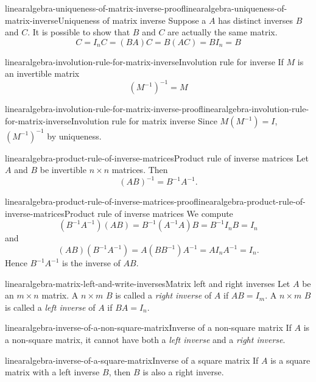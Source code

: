 \documentclass[preview]{standalone}
\begin{document}
\begin{snippetproof}{linearalgebra-uniqueness-of-matrix-inverse-proof}{linearalgebra-uniqueness-of-matrix-inverse}{Uniqueness of matrix inverse}
    Suppose a \matrix \(A\) has distinct inverses \(B\)
    and \(C\).
    It is possible to show that \(B\) and \(C\) are actually
    the same matrix.
    \[
        C=I_n C = (BA) C = B (AC) = BI_n = B
    \]
\end{snippetproof}

\begin{snippetproposition}{linearalgebra-involution-rule-for-matrix-inverse}{Involution rule for \matrix inverse}
    If \(M\) is an invertible matrix
    \[
        {(M^{-1})}^{-1} = M
    \]
\end{snippetproposition}

\begin{snippetproof}{linearalgebra-involution-rule-for-matrix-inverse-proof}{linearalgebra-involution-rule-for-matrix-inverse}{Involution rule for matrix inverse}
    Since \(M(M^{-1}) = I\), \({(M^{-1})}^{-1}\)
    by uniqueness. %
\end{snippetproof}

\begin{snippetproposition}{linearalgebra-product-rule-of-inverse-matrices}{Product rule of inverse matrices}
    Let \(A\) and \(B\) be invertible \(n\times n\) matrices. Then
    \[
        {(AB)}^{-1} = B^{-1} A^{-1}.
    \]
\end{snippetproposition}

\begin{snippetproof}{linearalgebra-product-rule-of-inverse-matrices-proof}{linearalgebra-product-rule-of-inverse-matrices}{Product rule of inverse matrices}
    We compute
    \[
        (B^{-1}A^{-1})(AB)
        =
        B^{-1}(A^{-1}A)B
        =
        B^{-1}I_nB
        =
        I_n
    \]
    and
    \[
        (AB)(B^{-1}A^{-1})
        =
        A(BB^{-1})A^{-1}
        =
        AI_nA^{-1}
        =
        I_n.
    \]
    Hence \(B^{-1}A^{-1}\) is the inverse of \(AB\).
\end{snippetproof}

\begin{snippetdefinition}{linearalgebra-matrix-left-and-write-inverses}{Matrix left and right inverses}
    Let \(A\) be an \(m \times n\) matrix. A \(n\times m\) \matrix \(B\)
    is called a \textit{right inverse} of \(A\)
    if \(AB=I_m\).
    A \(n\times m\) \matrix \(B\) is called a \textit{left inverse} of \(A\)
    if \(BA=I_n\).
\end{snippetdefinition}

\begin{snippetproposition}{linearalgebra-inverse-of-a-non-square-matrix}{Inverse of a non-square matrix}
    If \(A\) is a non-square matrix, it cannot have
    both a \textit{left inverse} and a \textit{right inverse}.
\end{snippetproposition}

\begin{snippetproposition}{linearalgebra-inverse-of-a-square-matrix}{Inverse of a square matrix}
    If \(A\) is a square matrix
    with a left inverse \(B\),
    then \(B\) is also a right inverse.
\end{snippetproposition}
\end{document}
